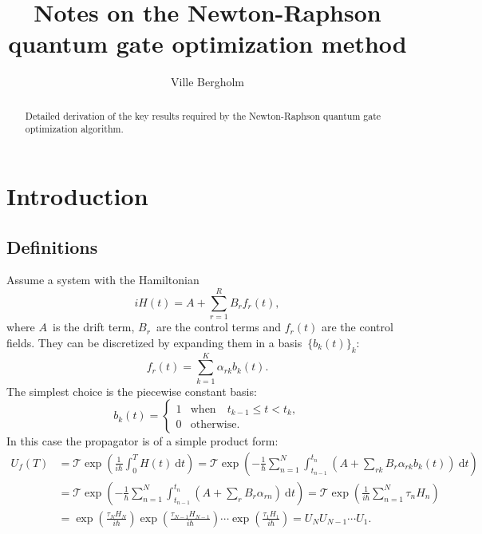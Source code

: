 \documentclass[aps,pra,12pt,showpacs,showkeys,nofootinbib,superscriptaddress,longbibliography]{revtex4}
\newcommand{\wrt}[1]{\: \mathrm{d}#1}  %
\newcommand{\be}{\begin{equation}}
\newcommand{\ee}{\end{equation}}
\begin{document}
\title{Notes on the Newton-Raphson quantum gate optimization method}

\author{Ville Bergholm}


\begin{abstract}
Detailed derivation of the key results required by the Newton-Raphson
quantum gate optimization algorithm.
\end{abstract}
\maketitle

\section{Introduction}

\subsection{Definitions}
Assume a system with the Hamiltonian
\be
i H(t) = A +\sum_{r=1}^R B_r f_r(t),
\ee
where $A$~is the drift term, $B_r$~are the control terms and
$f_r(t)$ are the control fields. They can be discretized by expanding
them in a basis~$\{b_k(t)\}_k$:
\be
f_r(t) = \sum_{k=1}^K \alpha_{rk} b_k(t).
\ee
The simplest choice is the piecewise constant basis:
\be
b_k(t) = 
\begin{cases}
  1 & \text{when} \quad t_{k-1} \le t < t_k,\\
  0 & \text{otherwise}.
\end{cases}
\ee
In this case the propagator is of a simple product form:
\begin{align*}
U_f(T)
&= \mathcal{T} \exp\left(\frac{1}{i\hbar} \int_0^T H(t) \wrt{t} \right)
=  \mathcal{T} \exp\left(- \frac{1}{\hbar} \sum_{n=1}^N \int_{t_{n-1}}^{t_n} \left(A +\sum_{rk} B_r \alpha_{rk} b_k(t)\right) \wrt{t} \right)\\
&= \mathcal{T} \exp\left(- \frac{1}{\hbar} \sum_{n=1}^N \int_{t_{n-1}}^{t_n} \left(A +\sum_{r} B_r \alpha_{rn} \right) \wrt{t} \right)
= \mathcal{T} \exp\left(\frac{1}{i\hbar} \sum_{n=1}^N \tau_n H_n \right)\\
&= \exp \left(\frac{\tau_N H_N}{i\hbar}\right)
\exp \left(\frac{\tau_{N-1} H_{N-1}}{i\hbar}\right) \cdots
\exp \left(\frac{\tau_1 H_1}{i\hbar}\right)
= U_N U_{N-1} \cdots U_1.
\end{align*}
\end{document}
